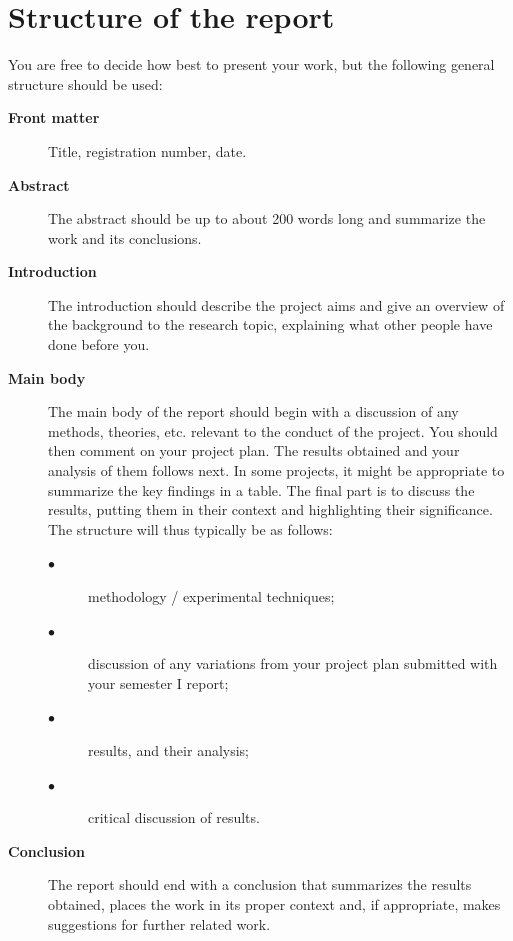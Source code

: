 \documentclass[a4paper,fleqn,usenatbib]{mnras}
\begin{document}
%

\section{Structure of the report}

You are free to decide how best to present your work, but the following general structure should be used:

\begin{description}
\item[\textbf{Front matter}]	Title, registration number, date.

\item[\textbf{Abstract}]	The abstract should be up to about 200 words long and summarize the work and its conclusions. 

\item[\textbf{Introduction}]	The introduction should describe the project aims and give an overview of the background to the research topic, explaining what other people have done before you. 

\item[\textbf{Main body}] The main body of the report should begin with a discussion of any methods, theories, etc. relevant to the conduct of the project. You should then comment on your project plan. The results obtained and your analysis of them follows next. In some projects, it might be appropriate to summarize the key findings in a table. The final part is to discuss the results, putting them in their context and highlighting their significance. The structure will thus typically be as follows:
\begin{description}
\item[$\bullet$] methodology / experimental techniques;
\item[$\bullet$] discussion of any variations from your project plan submitted with your semester I report;
\item[$\bullet$] results, and their analysis;
\item[$\bullet$] critical discussion of results.
\end{description}

\item[\textbf{Conclusion}]	The report should end with a conclusion that summarizes the results obtained, places the work in its proper context and, if appropriate, makes suggestions for further related work. 


\end{description}
\end{document}
